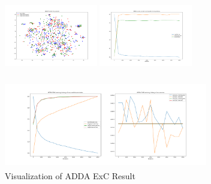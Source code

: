 \documentclass[conference]{IEEEtran}
\begin{document}
\begin{figure}[htb]

\centering
\begin{minipage}[t]{0.26\textwidth}
\includegraphics[width=1.6in, height=1.5in]{Ladda/std_C2R/ADDA_visual.png}
\end{minipage}%
\begin{minipage}[t]{0.26\textwidth}
\includegraphics[width=1.6in, height=1.5in]{Ladda/std_C2R/clf.png}
\end{minipage}%
\begin{minipage}[t]{0.45\textwidth}
\includegraphics[width=3.5in, height=1.5in]{Ladda/std_C2R/gan.png}
\end{minipage}%
\caption{Visualization of ADDA ExC Result}\label{fig:ExC}
\end{figure}
\end{document}
